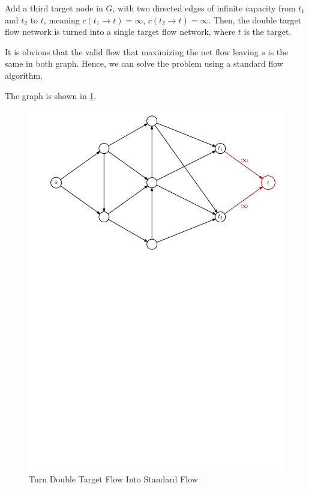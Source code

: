 \documentclass[12pt,letterpaper,titlepage,en-US]{article}
\begin{document}
\begin{homeworkProblem}
\begin{homeworkSubProblem}
\end{homeworkSubProblem}
\begin{homeworkSubProblem}
Add a third target node in $G$, with two directed edges of infinite capacity from $t_1$ and $t_2$ to $t$,
meaning $c(t_1 \rightarrow t) = \infty$, $c(t_2 \rightarrow t) = \infty$.
Then, the double target flow network is turned into a single target flow network,
where $t$ is the target.

It is obvious that the valid flow that maximizing the net flow
leaving $s$ is the same in both graph.
Hence, we can solve the problem using a standard flow algorithm.

The graph is shown in \cref{p4b}.
\begin{figure}[H]
    \caption{Turn Double Target Flow Into Standard Flow}\label{p4b}
    \centering
    \includegraphics[width=.7\textwidth]{p4b}
\end{figure}


\end{homeworkSubProblem}
\end{homeworkProblem}
\end{document}
